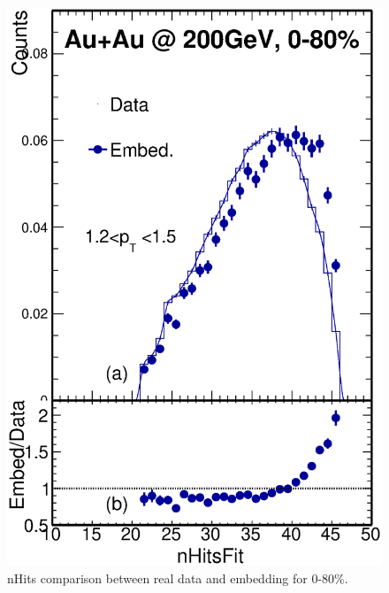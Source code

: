 \begin{figure}[htbp]
\begin{minipage}[htbp]{0.45\linewidth}
\centering
\includegraphics[width=1.0\textwidth,angle=0]{figure/Run14_D0HFT/nHitsFit11_6.eps}
\caption{ nHits comparison between real data and embedding for 0-80\%. \label{nHits_0_80}}
\end{minipage}
\hfill
\begin{minipage}[htbp]{0.45\linewidth}
\centering

\end{minipage}
\end{figure}
